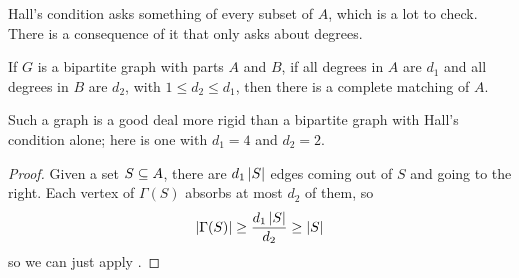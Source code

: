Hall's condition asks something of every subset of $A$, which is a lot to check. There is a consequence of it that only asks about degrees.

\begin{boxtheorem} \label{Ch3:Cor:Biregular}
    If $G$ is a bipartite graph with parts $A$ and $B$, if all degrees in $A$ are $d_1$ and all degrees in $B$ are $d_2$, with $1 \leq d_2 \leq d_1$, then there is a complete matching of $A$.
\end{boxtheorem}

Such a graph is a good deal more rigid than a bipartite graph with Hall's condition alone; here is one with $d_1 = 4$ and $d_2 = 2$.

\begin{figure}[H]
    \centering
\end{figure}

\begin{proof}
    Given a set $S \subseteq A$, there are $d_1 \left\lvert S \right\rvert$ edges coming out of $S$ and going to the right. Each vertex of $\Gamma(S)$ absorbs at most $d_2$ of them, so
    \begin{align*}
        \left\lvert \Gamma(S) \right\rvert \geq \frac{d_1\left\lvert S \right\rvert}{d_2} \geq \left\lvert S \right\rvert
    \end{align*}
    so we can just apply .
\end{proof}
